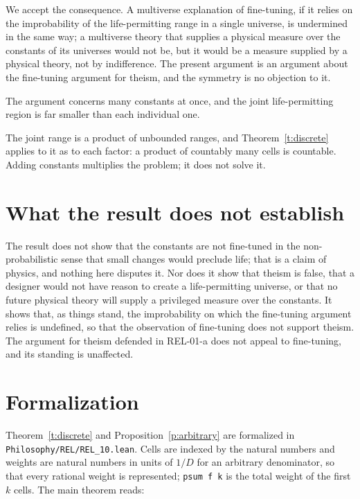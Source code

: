 \documentclass{situationist-preprint}
\begin{document}
\begin{reply}
We accept the consequence. A multiverse explanation of fine-tuning, if it relies on the improbability of the life-permitting range in a single universe, is undermined in the same way; a multiverse theory that supplies a physical measure over the constants of its universes would not be, but it would be a measure supplied by a physical theory, not by indifference. The present argument is an argument about the fine-tuning argument for theism, and the symmetry is no objection to it.
\end{reply}

\begin{objection}
The argument concerns many constants at once, and the joint life-permitting region is far smaller than each individual one.
\end{objection}

\begin{reply}
The joint range is a product of unbounded ranges, and Theorem~\ref{t:discrete} applies to it as to each factor: a product of countably many cells is countable. Adding constants multiplies the problem; it does not solve it.
\end{reply}

\section{What the result does not establish}

The result does not show that the constants are not fine-tuned in the non-probabilistic sense that small changes would preclude life; that is a claim of physics, and nothing here disputes it. Nor does it show that theism is false, that a designer would not have reason to create a life-permitting universe, or that no future physical theory will supply a privileged measure over the constants. It shows that, as things stand, the improbability on which the fine-tuning argument relies is undefined, so that the observation of fine-tuning does not support theism. The argument for theism defended in REL-01-a does not appeal to fine-tuning, and its standing is unaffected.

\section{Formalization}

Theorem~\ref{t:discrete} and Proposition~\ref{p:arbitrary} are formalized in \nolinkurl{Philosophy/REL/REL_10.lean}. Cells are indexed by the natural numbers and weights are natural numbers in units of $1/D$ for an arbitrary denominator, so that every rational weight is represented; \texttt{psum f k} is the total weight of the first $k$ cells. The main theorem reads:
\end{document}

